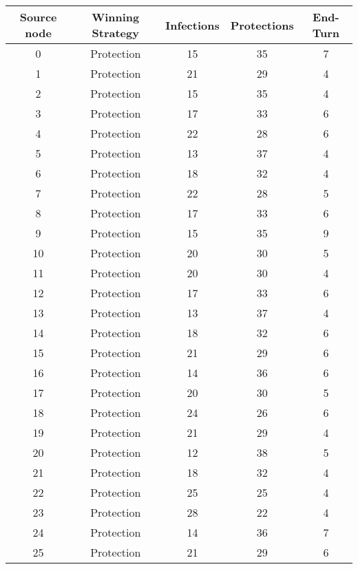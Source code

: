 \documentclass[results.tex]{subfiles}
\begin{document}
\begin{center}
  \begin{tabular}{| c || c | c | c | c |}
    \hline
    {\bfseries Source node} & {\bfseries Winning Strategy} & {\bfseries Infections} & {\bfseries Protections} & {\bfseries End-Turn} \\  %
    \hline\hline
    0 & Protection & 15 & 35 & 7 \\ 
    \hline
    1 & Protection & 21 & 29 & 4 \\ 
    \hline
    2 & Protection & 15 & 35 & 4 \\ 
    \hline
    3 & Protection & 17 & 33 & 6 \\ 
    \hline
    4 & Protection & 22 & 28 & 6 \\ 
    \hline
    5 & Protection & 13 & 37 & 4 \\ 
    \hline
    6 & Protection & 18 & 32 & 4 \\ 
    \hline
    7 & Protection & 22 & 28 & 5 \\ 
    \hline
    8 & Protection & 17 & 33 & 6 \\ 
    \hline
    9 & Protection & 15 & 35 & 9 \\ 
    \hline
    10 & Protection & 20 & 30 & 5 \\ 
    \hline
    11 & Protection & 20 & 30 & 4 \\ 
    \hline
    12 & Protection & 17 & 33 & 6 \\ 
    \hline
    13 & Protection & 13 & 37 & 4 \\ 
    \hline
    14 & Protection & 18 & 32 & 6 \\ 
    \hline
    15 & Protection & 21 & 29 & 6 \\ 
    \hline
    16 & Protection & 14 & 36 & 6 \\ 
    \hline
    17 & Protection & 20 & 30 & 5 \\ 
    \hline
    18 & Protection & 24 & 26 & 6 \\ 
    \hline
    19 & Protection & 21 & 29 & 4 \\ 
    \hline
    20 & Protection & 12 & 38 & 5 \\ 
    \hline
    21 & Protection & 18 & 32 & 4 \\ 
    \hline
    22 & Protection & 25 & 25 & 4 \\ 
    \hline
    23 & Protection & 28 & 22 & 4 \\ 
    \hline
    24 & Protection & 14 & 36 & 7 \\ 
    \hline
    25 & Protection & 21 & 29 & 6 \\ 

\end{tabular}
\end{center}
\end{document}
